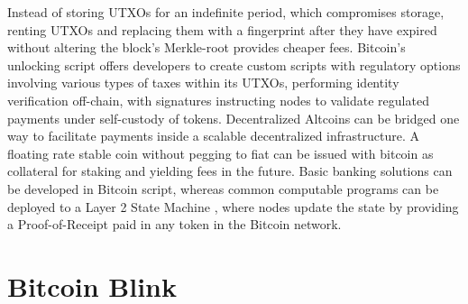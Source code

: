 \documentclass[a4paper, 10pt]{extarticle}
\begin{document}
Instead of storing UTXOs for an indefinite period, which compromises storage, renting UTXOs and replacing them with a fingerprint after they have expired without altering the block’s Merkle-root provides cheaper fees. Bitcoin’s unlocking script offers developers to create custom scripts with regulatory options involving various types of taxes within its UTXOs, performing identity verification off-chain, with signatures instructing nodes to validate regulated payments under self-custody of tokens. Decentralized Altcoins can be bridged one way to facilitate payments inside a scalable decentralized infrastructure. A floating rate stable coin \cite{stablecoin} without pegging to fiat can be issued with bitcoin as collateral for staking and yielding fees in the future. Basic banking solutions can be developed in Bitcoin script, whereas common computable programs can be deployed to a Layer 2 State Machine \cite{wood2014ethereum}, where nodes update the state by providing a Proof-of-Receipt paid in any token in the Bitcoin network.
\section{Bitcoin Blink} 
\end{document}
